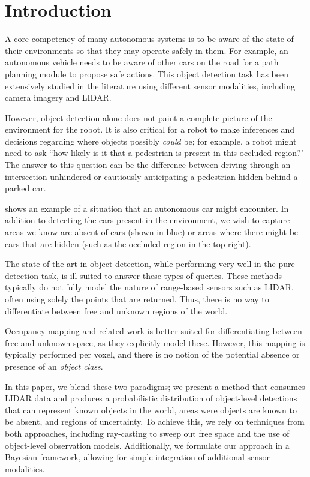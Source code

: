 \section{Introduction}\label{sec:intro}

A core competency of many autonomous systems is to be aware of the state of
their environments so that they may operate safely in them. For example, an
autonomous vehicle needs to be aware of other cars on the road for a path
planning module to propose safe actions. This object detection task has been
extensively studied in the literature using different sensor modalities,
including camera imagery and \ac{LIDAR}.

However, object detection alone does not paint a complete picture of the
environment for the robot. It is also critical for a robot to make inferences
and decisions regarding where objects possibly \emph{could} be; for example, a
robot might need to ask ``how likely is it that a pedestrian is present in this
occluded region?" The answer to this question can be the difference between
driving through an intersection unhindered or cautiously anticipating a
pedestrian hidden behind a parked car.

 shows an example of a situation that an autonomous car might
encounter. In addition to detecting the cars present in the environment, we
wish to capture areas we know are absent of cars (shown in blue) or areas where
there might be cars that are hidden (such as the occluded region in the top
right).

The state-of-the-art in object detection, while performing very well in the pure
detection task, is ill-suited to answer these types of queries. These methods
typically do not fully model the nature of range-based sensors such as
\ac{LIDAR}, often using solely the points that are returned. Thus, there is no
way to differentiate between free and unknown regions of the world.

Occupancy mapping and related work is better suited for differentiating between
free and unknown space, as they explicitly model these. However, this mapping is
typically performed per voxel, and there is no notion of the potential absence
or presence of an \emph{object class}.

In this paper, we blend these two paradigms; we present a method that
consumes \ac{LIDAR} data and produces a probabilistic distribution of object-level
detections that can represent known objects in the world, areas were objects are
known to be absent, and regions of uncertainty. To achieve this, we rely on
techniques from both approaches, including ray-casting to sweep out free space
and the use of object-level observation models. Additionally, we formulate our
approach in a Bayesian framework, allowing for simple integration of additional
sensor modalities.

